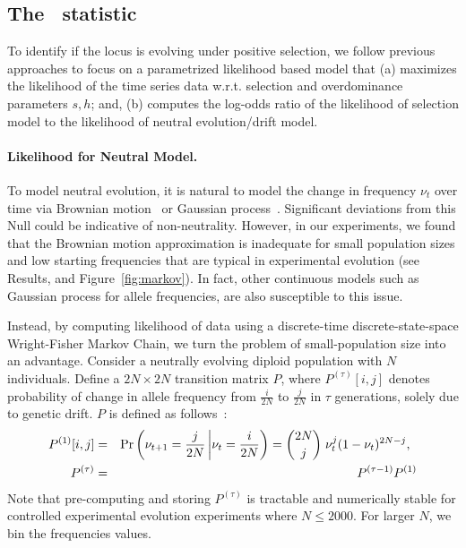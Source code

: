 \documentclass[11pt]{article}
\def\comale{\text{{\sc Comale}}}
\begin{document}
\subsection{The \comale\  statistic}
To identify if the locus is evolving under positive selection, we
follow previous approaches to focus on a parametrized likelihood based
model that (a) maximizes the likelihood of the time series data
w.r.t. selection and overdominance parameters $s,h$; and, (b) computes
the log-odds ratio of the likelihood of selection model to the
likelihood of neutral evolution/drift model.

\paragraph{Likelihood for Neutral Model.}
To model neutral evolution, it is natural to model the change in
frequency $\nu_t$ over time via Brownian
motion~\cite{feder2014Identifying} or Gaussian
process~\cite{Terhorst2015Multi}. Significant deviations from this
Null could be indicative of non-neutrality. However, in our
experiments, we found that the Brownian motion approximation is
inadequate for small population sizes and low starting frequencies
that are typical in experimental evolution (see Results, and
Figure~\ref{fig:markov}). In fact, other continuous models such as
Gaussian process for allele frequencies, are also susceptible to this
issue.

Instead, by computing likelihood of data using a discrete-time
discrete-state-space Wright-Fisher Markov Chain, we turn the problem
of small-population size into an advantage. Consider a neutrally
evolving diploid population with $N$ individuals. Define a
$2N\times2N$ transition matrix $P$, where $P^{(\tau)}[i,j]$ denotes
probability of change in allele frequency from $\frac{i}{2N}$ to
$\frac{j}{2N}$ in $\tau$ generations, solely due to genetic drift. $P$
is defined as follows~\cite{Ewens2012Mathematical}:
\begin{eqnarray}
  P^{(1)}[i,j] &=& \operatorname{Pr}\left(\nu_{t+1}=\frac{j}{2N} \left|
      \nu_{t}=\frac{i}{2N}\right)={2N \choose j} \right.  \nu_{t}^j
  (1-\nu_{t})^{2N-j}, \;\;\label{eq:P1}\\
  P^{(\tau)} &=&   P^{(\tau-1)}P^{(1)} \label{eq:Pt}
\end{eqnarray}
Note that pre-computing and storing $P^{(\tau)}$ is tractable and
numerically stable for controlled experimental evolution experiments
where $N\le2000$. For larger $N$, we bin the frequencies values.
\end{document}
